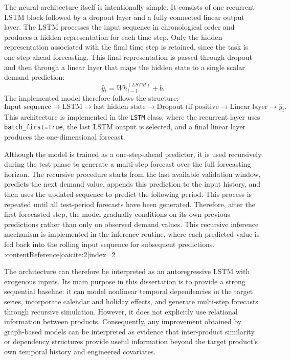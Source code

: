 The neural architecture itself is intentionally simple. It consists of one recurrent LSTM block followed by a dropout layer and a fully connected linear output layer. The LSTM processes the input sequence in chronological order and produces a hidden representation for each time step. Only the hidden representation associated with the final time step is retained, since the task is one-step-ahead forecasting. This final representation is passed through dropout and then through a linear layer that maps the hidden state to a single scalar demand prediction:
\[
\hat{y}_t = W h_{t-1}^{(LSTM)} + b.
\]
The implemented model therefore follows the structure:
\[
\text{Input sequence} \rightarrow \text{LSTM} \rightarrow \text{last hidden state} \rightarrow \text{Dropout (if positive} \rightarrow \text{Linear layer} \rightarrow \hat{y}_t.
\]
This architecture is implemented in the \texttt{LSTM} class, where the recurrent layer uses \texttt{batch\_first=True}, the last LSTM output is selected, and a final linear layer produces the one-dimensional forecast.

Although the model is trained as a one-step-ahead predictor, it is used recursively during the test phase to generate a multi-step forecast over the full forecasting horizon. The recursive procedure starts from the last available validation window, predicts the next demand value, appends this prediction to the input history, and then uses the updated sequence to predict the following period. This process is repeated until all test-period forecasts have been generated. Therefore, after the first forecasted step, the model gradually conditions on its own previous predictions rather than only on observed demand values. This recursive inference mechanism is implemented in the inference routine, where each predicted value is fed back into the rolling input sequence for subsequent predictions. :contentReference[oaicite:2]{index=2}

The architecture can therefore be interpreted as an autoregressive LSTM with exogenous inputs. Its main purpose in this dissertation is to provide a strong sequential baseline: it can model nonlinear temporal dependencies in the target series, incorporate calendar and holiday effects, and generate multi-step forecasts through recursive simulation. However, it does not explicitly use relational information between products. Consequently, any improvement obtained by graph-based models can be interpreted as evidence that inter-product similarity or dependency structures provide useful information beyond the target product's own temporal history and engineered covariates.

